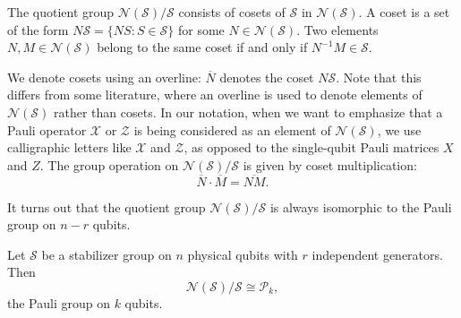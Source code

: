 The quotient group $\mathcal{N}(\mathcal{S})/\mathcal{S}$ consists of cosets of $\mathcal{S}$ in $\mathcal{N}(\mathcal{S})$.
A coset is a set of the form $N\mathcal{S} = \{ NS : S \in \mathcal{S} \}$ for some $N \in \mathcal{N}(\mathcal{S})$.
Two elements $N, M \in \mathcal{N}(\mathcal{S})$ belong to the same coset if and only if $N^{-1} M \in \mathcal{S}$.

We denote cosets using an overline: $\overline{N}$ denotes the coset $N\mathcal{S}$.
Note that this differs from some literature, where an overline is used to denote elements of $\mathcal{N}(\mathcal{S})$ rather than cosets.
In our notation, when we want to emphasize that a Pauli operator $\mathcal{X}$ or $\mathcal{Z}$ is being considered as an element of $\mathcal{N}(\mathcal{S})$, we use calligraphic letters like $\mathcal{X}$ and $\mathcal{Z}$, as opposed to the single-qubit Pauli matrices $X$ and $Z$.
The group operation on $\mathcal{N}(\mathcal{S})/\mathcal{S}$ is given by coset multiplication:
\begin{equation}
    \overline{N} \cdot \overline{M} = \overline{NM}.
\end{equation}

It turns out that the quotient group $\mathcal{N}(\mathcal{S})/\mathcal{S}$ is always isomorphic to the Pauli group on $n-r$ qubits.

\begin{theorem}
    \cite[Theorem 3.11]{gottesman2024surviving} Let $\mathcal{S}$ be a stabilizer group on $n$ physical qubits with $r$ independent generators.
    Then
    \begin{equation}
        \mathcal{N}(\mathcal{S})/\mathcal{S} \cong \mathcal{P}_k,
    \end{equation}
    the Pauli group on $k$ qubits.
\end{theorem}


